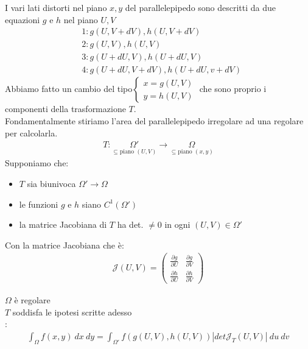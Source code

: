 \documentclass[a4paper, oneside]{article}
\begin{document}
I vari lati distorti nel piano $x,y$ del parallelepipedo sono descritti da due equazioni $g$ e $h$ nel piano $U,V$
\begin{align*}
    &1: g(U,V+dV), h(U,V+dV)\\
    &2: g(U,V), h(U,V)\\
    &3: g(U+dU,V), h(U+dU,V)\\
    &4: g(U+dU,V+dV), h(U+dU,v+dV)
\end{align*}
Abbiamo fatto un cambio del tipo$\begin{cases}
    x = g(U,V)\\
    y = h(U,V)
\end{cases}$ che sono proprio i componenti della trasformazione $T$.\\
Fondamentalmente stiriamo l'area del parallelepipedo irregolare ad una regolare per calcolarla. 
\begin{gather*}
    T:\underset{\subseteq \text{piano } (U,V)}{\Omega'} \to \underset{\subseteq \text{piano } (x,y)}{\Omega}
\end{gather*}
Supponiamo che:
\begin{itemize}
    \item $T$ sia biunivoca $\Omega ' \to \Omega$
    \item le funzioni $g$ e $h$ siano $C^1 (\Omega')$
    \item la matrice Jacobiana di $T$ ha det. $\neq 0$ in ogni $(U,V) \in \Omega'$
\end{itemize}
Con la matrice Jacobiana che è:
\begin{gather*}
    \mathcal{J} (U,V) = \begin{pmatrix}
        \frac{\partial g}{\partial U} & \frac{\partial g}{\partial V}\\
        \frac{\partial h}{\partial U} & \frac{\partial h}{\partial V}
    \end{pmatrix}
\end{gather*}


\begin{theorem}
     $\Omega$ è regolare\\
     $T$ soddisfa le ipotesi scritte adesso\\
    :
    \begin{gather*}
        \int_{\Omega} f(x,y) \ dx \ dy = \int_{\Omega'} f(g(U,V), h(U,V)) \left\lvert det \mathcal{J}_T (U,V) \right\rvert \ du \ dv 
    \end{gather*}
\end{theorem}
\end{document}

